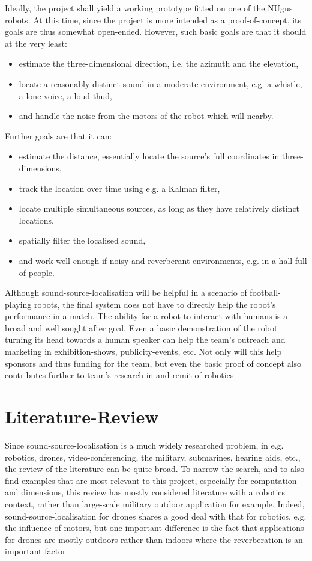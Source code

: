 \documentclass{report}
\begin{document}
Ideally, the project shall yield a working prototype fitted on one of the NUgus robots. At this time, since the project is more intended as a proof-of-concept, its goals are thus somewhat open-ended. However, such basic goals are that it should at the very least:
\begin{itemize}
	\item estimate the three-dimensional direction, i.e. the azimuth and the elevation,
	\item locate a reasonably distinct sound in a moderate environment, e.g. a whistle, a lone voice, a loud thud,
	\item and handle the noise from the motors of the robot which will nearby.
\end{itemize}
Further goals are that it can:
\begin{itemize}
	\item estimate the distance, essentially locate the source's full coordinates in three-dimensions,
	\item track the location over time using e.g. a Kalman filter,
	\item locate multiple simultaneous sources, as long as they have relatively distinct locations,
	\item spatially filter the localised sound,
	\item and work well enough if noisy and reverberant environments, e.g. in a hall full of people.
\end{itemize}


Although sound-source-localisation will be helpful in a scenario of football-playing robots, the final system does not have to directly help the robot's performance in a match. The ability for a robot to interact with humans is a broad and well sought after goal. Even a basic demonstration of the robot turning its head towards a human speaker can help the team's outreach and marketing in exhibition-shows, publicity-events, etc. Not only will this help sponsors and thus funding for the team, but even the basic proof of concept also contributes further to team's research in and remit of robotics 

\chapter{Literature-Review}

Since sound-source-localisation is a much widely researched problem, in e.g. robotics, drones, video-conferencing, the military, submarines, hearing aids, etc., the review of the literature can be quite broad. To narrow the search, and to also find examples that are most relevant to this project, especially for computation and dimensions, this review has mostly considered literature with a robotics context, rather than large-scale military outdoor application for example. Indeed, sound-source-localisation for drones shares a good deal with that for robotics, e.g. the influence of motors, but one important difference is the fact that applications for drones are mostly outdoors rather than indoors where the reverberation is an important factor.
\end{document}
